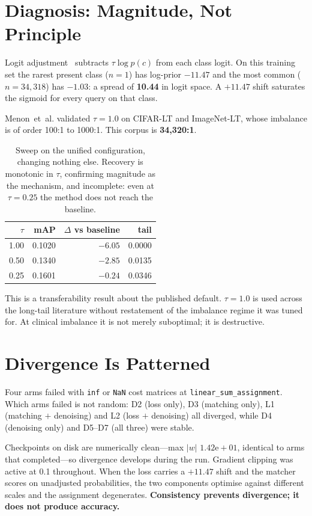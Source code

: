 \documentclass[11pt,letterpaper]{article}
\begin{document}
\section{Diagnosis: Magnitude, Not Principle}

Logit adjustment~\cite{menon2021logit} subtracts $\tau\log p(c)$ from each class
logit. On this training set the rarest present class ($n=1$) has log-prior
$-11.47$ and the most common ($n=34{,}318$) has $-1.03$: a spread of
\textbf{10.44} in logit space. A $+11.47$ shift saturates the sigmoid for every
query on that class.

Menon~et~al. validated $\tau=1.0$ on CIFAR-LT and ImageNet-LT, whose imbalance
is of order 100:1 to 1000:1. This corpus is \textbf{34{,}320:1}.

\begin{table}[h]
\centering\small
\begin{tabular}{rrrr}
\toprule
$\tau$ & mAP & $\Delta$ vs baseline & tail \\
\midrule
1.00 & 0.1020 & $-6.05$ & 0.0000 \\
0.50 & 0.1340 & $-2.85$ & 0.0135 \\
0.25 & 0.1601 & $-0.24$ & 0.0346 \\
\bottomrule
\end{tabular}
\caption{Sweep on the unified configuration, changing nothing else. Recovery is
monotonic in $\tau$, confirming magnitude as the mechanism, and incomplete:
even at $\tau=0.25$ the method does not reach the baseline.}
\end{table}

This is a transferability result about the published default. $\tau=1.0$ is used
across the long-tail literature without restatement of the imbalance regime it
was tuned for. At clinical imbalance it is not merely suboptimal; it is
destructive.

\section{Divergence Is Patterned}

Four arms failed with \texttt{inf} or \texttt{NaN} cost matrices at
\texttt{linear\_sum\_assignment}. Which arms failed is not random: D2 (loss
only), D3 (matching only), L1 (matching $+$ denoising) and L2 (loss $+$
denoising) all diverged, while D4 (denoising only) and D5--D7 (all three) were
stable.

Checkpoints on disk are numerically clean---max $|w|$ $1.42\mathrm{e}{+}01$,
identical to arms that completed---so divergence develops during the run.
Gradient clipping was active at 0.1 throughout. When the loss carries a $+11.47$
shift and the matcher scores on unadjusted probabilities, the two components
optimise against different scales and the assignment degenerates.
\textbf{Consistency prevents divergence; it does not produce accuracy.}
\end{document}
